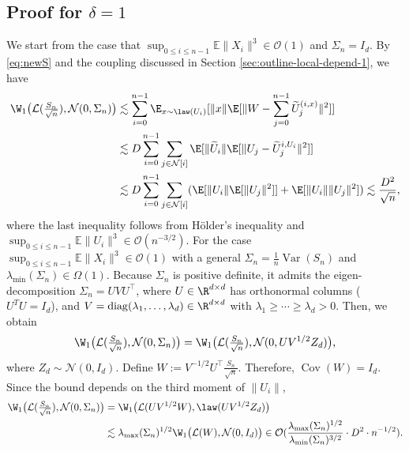 \documentclass[mnsc,nonblindrev]{informs3}
\begin{document}
\subsection{Proof for $\delta = 1$}\label{sec:proof-local-depend-1-optimal}
We start from the case that \(\sup_{0\le i\le n-1}\mathbb{E}\|X_i\|^{3}\in \mathcal{O}(1)\) and $\Sigma_n = I_d$.  By \eqref{eq:newS} and the coupling discussed in Section \ref{sec:outline-local-depend-1}, we have
\begin{align*}
\W_1\big(\mathcal{L}(\tfrac{S_n}{\sqrt{n}}),\mathcal{N}(0,\Sigma_n)\big) 
&\lesssim \sum_{i=0}^{n-1}\E_{x \sim \law(U_i)}[\|x\|\E[\|W-\sum_{j=0}^{n-1}\widetilde U_j^{(i,x)}\|^2]]\\
&\lesssim D\sum_{i=0}^{n-1}\sum_{j \in \mathcal N[i]}\E[\|\widetilde U_i\|\E[\|U_j - \widetilde U_j^{i, U_i}\|^2]]\\
&\lesssim D\sum_{i=0}^{n-1}\sum_{j \in \mathcal N[i]}(\E[\|U_i\|\E[\|U_j\|^2]]+\E[\|U_i\|\| U_j\|^2]) \lesssim \frac{D^2}{\sqrt{n}},
\end{align*}
where the last inequality follows from Hölder’s inequality and 
\(\sup_{0\le i\le n-1}\mathbb{E}\|U_i\|^{3}\in \mathcal{O}(n^{-3/2})\). For the case \(\sup_{0\le i\le n-1}\mathbb{E}\|X_i\|^{3}\in \mathcal{O}(1)\) with a general $\Sigma_n = \frac{1}{n}\operatorname{Var}(S_n)$ and $\lambda_{\min}(\Sigma_n) \in \Omega(1)$. Because $\Sigma_n$ is positive definite, it admits the eigen-decomposition $\Sigma_n = UVU^\top$, where $U \in \R^{d \times d}$ has orthonormal columns ($U^TU = I_d$), and $V = \operatorname{diag}(\lambda_1, \dots, \lambda_d) \in \R^{d \times d}$ with $\lambda_1 \geq \cdots \geq \lambda_d >0.$ Then, we obtain
\[
\W_1\big(\mathcal{L}(\tfrac{S_n}{\sqrt{n}}),\mathcal{N}(0,\Sigma_n)\big)=\W_1\big(\mathcal{L}(\tfrac{S_n}{\sqrt{n}}),\mathcal{N}(0,UV^{1/2} Z_d)\big),
\]
where $Z_d \sim \mathcal{N}(0, I_d)$.
Define $W:= V^{-1/2}U^\top\tfrac{S_n}{\sqrt{n}}$. Therefore, $\operatorname{Cov}(W) = I_d$. Since the bound depends on the third moment of $\|U_i\|$,
\begin{align*}
\W_1\big(\mathcal{L}(\tfrac{S_n}{\sqrt{n}}),\mathcal{N}(0,\Sigma_n)\big)&=\W_1\big(\mathcal{L}(UV^{1/2}W),\law(UV^{1/2} Z_d)\big)\\
&\lesssim \lambda_{\max}(\Sigma_n)^{1/2} \W_1\big(\mathcal{L}(W),\mathcal{N}(0,I_d)\big) \in \mathcal{O}(\frac{\lambda_{\max}(\Sigma_n)^{1/2}}{\lambda_{\min}(\Sigma_n)^{3/2}}\cdot D^2 \cdot n^{-1/2}).
\end{align*}
\end{document}
